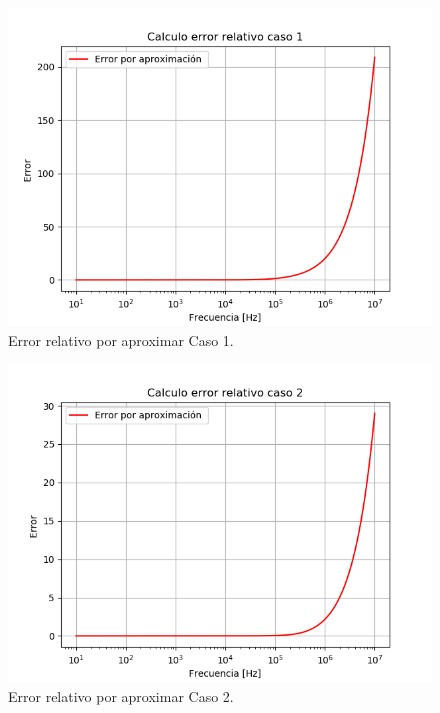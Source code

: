 \begin{figure}[H]	
	\centering
	\includegraphics[width=\textwidth]{Ejercicio1/Imagenes/error1.png}
	\caption{Error relativo por aproximar Caso 1.}
	\label{fig:e1}
\end{figure}
\begin{figure}[H]	
	\centering
	\includegraphics[width=\textwidth]{Ejercicio1/Imagenes/error2.png}
	\caption{Error relativo por aproximar Caso 2.}
	\label{fig:e2}
\end{figure}
